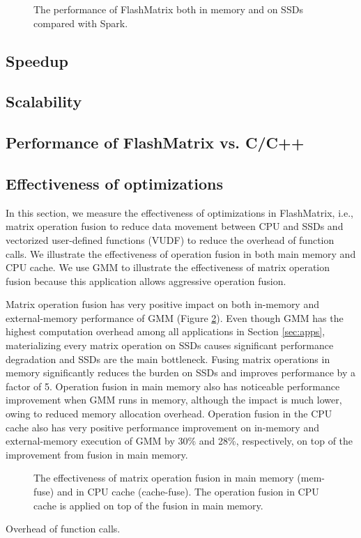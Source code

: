 \begin{figure}
	\begin{center}
		\footnotesize
		
		\caption{The performance of FlashMatrix both in memory and on SSDs
		compared with Spark.}
		\label{perf:fm}
	\end{center}
\end{figure}


\subsection{Speedup}

\subsection{Scalability}

\subsection{Performance of FlashMatrix vs. C/C++}

\subsection{Effectiveness of optimizations}

In this section, we measure the effectiveness of optimizations in FlashMatrix,
i.e., matrix operation fusion to reduce data movement between CPU and SSDs and
vectorized user-defined functions (VUDF) to reduce the overhead of function
calls. We illustrate the effectiveness of operation fusion in both main memory
and CPU cache. We use GMM to illustrate the effectiveness of matrix
operation fusion because this application allows aggressive operation fusion.

Matrix operation fusion has very positive impact on both in-memory and
external-memory performance of GMM (Figure \ref{perf:mem_move}). Even though
GMM has the highest computation overhead among all applications in Section
\ref{sec:apps}, materializing every matrix operation on SSDs causes significant
performance degradation and SSDs are the main bottleneck. Fusing matrix
operations in memory significantly reduces the burden on SSDs and improves
performance by a factor of 5. Operation fusion in main memory also has noticeable
performance improvement when GMM runs in memory, although the impact is much
lower, owing to reduced memory allocation overhead. Operation fusion in
the CPU cache also has very positive performance improvement on in-memory
and external-memory execution of GMM by 30\% and 28\%, respectively, on top of
the improvement from fusion in main memory.

\begin{figure}
	\begin{center}
		\footnotesize
		
		\caption{The effectiveness of matrix operation fusion in main memory
			(mem-fuse) and in CPU cache (cache-fuse). The operation fusion in
		CPU cache is applied on top of the fusion in main memory.}
		\label{perf:mem_move}
	\end{center}
\end{figure}

Overhead of function calls.
